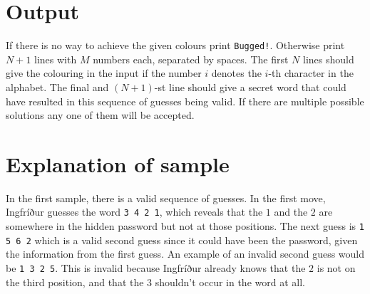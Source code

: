 \section*{Output}

If there is no way to achieve the given colours print \texttt{Bugged!}.
Otherwise print $N + 1$ lines with $M$ numbers each, separated by spaces.
The first $N$ lines should give the colouring in the input if the number $i$ 
denotes the $i$-th character in the alphabet. The final and $(N+1)$-st line
should give a secret word that could have resulted in this sequence of
guesses being valid. If there are multiple possible solutions any one of them 
will be accepted.

\section*{Explanation of sample}
In the first sample, there is a valid sequence of guesses. In the first move, 
Ingfríður guesses the word \verb|3 4 2 1|, which reveals that the $1$ and the $2$
are somewhere in the hidden password but not at those positions. The next guess 
is \verb|1 5 6 2| which is a valid second guess since it could have been the 
password, given the information from the first guess. An example of an invalid 
second guess would be \verb|1 3 2 5|. This is invalid because Ingfríður already
knows that the $2$ is not on the third position, and that the $3$ shouldn't 
occur in the word at all.


